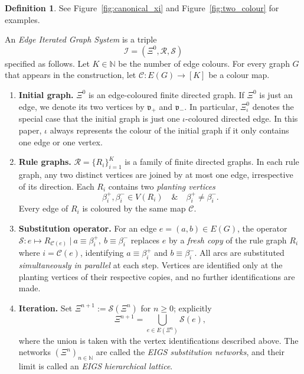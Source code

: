 \documentclass{article}
\DeclareRobustCommand{\revision}[1]{{\color{red}#1}}
\theoremstyle{plain}
\theoremstyle{definition}
\newtheorem{definition}[theorem]{Definition}
\begin{document}
\begin{definition}\label{definition:EIGS}
See Figure~\ref{fig:canonical_xi} and Figure~\ref{fig:two_colour} for examples.

An \emph{Edge Iterated Graph System} is a triple
\[
   \mathscr I=(\Xi^{0},\mathcal R,\mathcal S)
\]
specified as follows.
Let $K\in\mathbb N$ be the number of edge colours.
For every graph $G$ that appears in the construction, let
$
   \mathscr{C} : E(G) \longrightarrow[K]
$
be a colour map.

\begin{enumerate}
\item \textbf{Initial graph.}
      $\Xi^{0}$ is an edge-coloured finite directed graph.
      If $\Xi^{0}$ is just an edge, we denote its two vertices by $\mathfrak v_+$ and $\mathfrak v_-$.
      In particular, $\Xi_{\iota}^0$ denotes the special case that the initial graph is just one $\iota$-coloured directed edge.
      In this paper, $\iota$ always represents the colour of the initial graph if it only contains one edge or one vertex.

\item \textbf{Rule graphs.}
      $\mathcal{R} = \{ R_i \}_{i=1}^{K}$ is a family of finite directed graphs.
      \revision{In each rule graph, any two distinct vertices are joined by at most one edge, irrespective of its direction.}
      Each $R_i$ contains two \emph{planting vertices}
      \[
         \beta_i^{+},\beta_i^{-} \in  V(R_i)
         \quad\&\quad
         \beta_i^{+}\neq\beta_i^{-}.
      \]
      Every edge of $R_i$ is coloured by the same map $\mathscr{C}$.

\item \textbf{Substitution operator.}
      For an edge $e=(a,b)\in E(G)$, the operator
      $
         \mathcal S\colon e\longmapsto R_{\mathscr{C}(e)}  \ \big|\
         a\equiv\beta_i^{+},\ b\equiv\beta_i^{-}
      $
      replaces $e$ by a \emph{fresh copy} of the rule graph $R_i$ where \(i=\mathscr C(e)\), identifying
      $
         a\equiv\beta_i^{+}
      $ and
      $
         b\equiv\beta_i^{-}.
      $
      All arcs are substituted \emph{simultaneously in parallel} at each step.
      Vertices are identified only at the planting vertices of their respective copies, and no further identifications are made.

\item \textbf{Iteration.}
      Set $\Xi^{n+1}:=\mathcal S(\Xi^{n})$ for $n\ge 0$; explicitly
      \[
         \Xi^{n+1}
         =
         \bigcup_{e\in E(\Xi^{n})}\mathcal S(e),
      \]
      where the union is taken with the vertex identifications described above.
    The networks $(\Xi^{n})_{n\in\mathbb N}$ are called the \emph{EIGS substitution networks}, and their limit is called an \emph{EIGS hierarchical lattice}.
\end{enumerate}
\end{definition}
\end{document}
